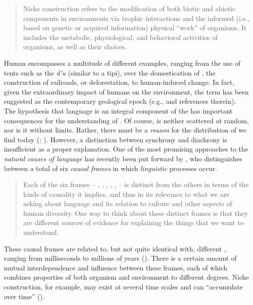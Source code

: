 \begin{quote}
Niche construction refers to the modification of both biotic and abiotic components in environments via trophic interactions and the informed (i.e., based on genetic or acquired information) physical “work” of organisms. It includes the metabolic, physiological, and behavioral activities of organisms, as well as their choices.
\end{quote}

\noindent Human  encompasses a multitude of different examples, ranging from the use of tents such as the  \textit{d’u} (similar to a tipi), over the domestication of , the construction of railroads, or deforestation, to human-induced  change. In fact, given the extraordinary impact of humans on the environment, the term \textit{} has been suggested as the contemporary geological epoch (e.g., \citealt{Rosol2017} and references therein). The hypothesis that language is an integral component of the  has important consequences for the understanding of . Of course,  is neither scattered at random, nor is it without limits. Rather, there must be a \textit{reason} for the distribution of  we find today (\citealt{Bickel2014}; \citealt[904f.]{Bickel2015}). However, a distinction between synchrony and diachrony is insufficient as a proper explanation. One of the most promising approaches to the \textit{natural causes of language} has recently been put forward by \citep[13ff.]{Enfield2014}, who distinguishes between a total of six \textit{causal frames} in which \textit{linguistic} processes occur.

\begin{quote}
Each of the six frames – , , , , ,  – is distinct from the others in terms of the kinds of causality it implies, and thus in its relevance to what we are asking about language and its relation to culture and other aspects of human diversity. One way to think about these distinct frames is that they are different sources of evidence for explaining the things that we want to understand. \citep[13]{Enfield2014}
\end{quote}

\noindent These causal frames are related to, but not quite identical with, different , ranging from milliseconds to millions of years (). There is a certain amount of mutual interdependence and influence between these frames, each of which combines properties of both organism and environment to different degrees. Niche construction, for example, may exist at several time scales and can “accumulate over time” (\citealt[18]{Odling-Smeeetal2013}).

